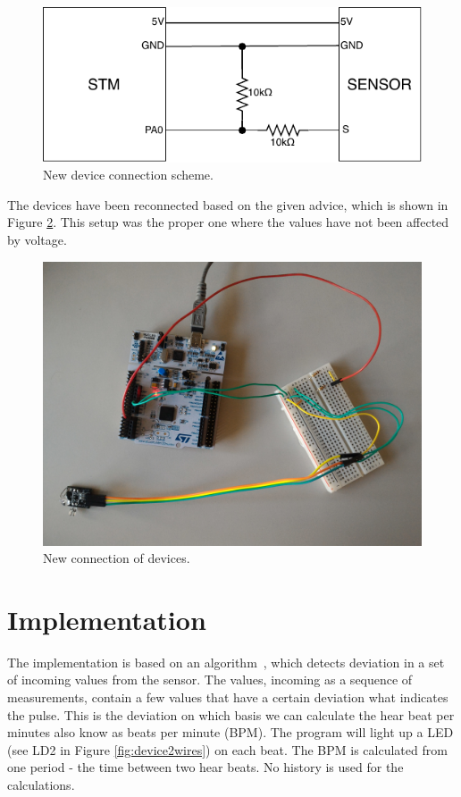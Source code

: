 \documentclass[11pt,a4paper]{article}
\begin{document}
\begin{figure}[H]
    \centering
    \includegraphics[scale=1.4]{img/new_con_scheme.pdf}
    \caption{New device connection scheme.}
    \label{fig:new_con_scheme}
\end{figure}

The devices have been reconnected based on the given advice, which is shown in Figure \ref{fig:new_dev_con}. This setup was the proper one where the values have not been affected by voltage.

\begin{figure}[H]
    \centering
    \includegraphics[scale=0.1]{img/setup2.jpg}
    \caption{New connection of devices.}
    \label{fig:new_dev_con}
\end{figure}

\newpage

\section{Implementation}
The implementation is based on an algorithm~\cite{SENSOR}, which detects deviation in a set of incoming values from the sensor. The values, incoming as a sequence of measurements, contain a few values that have a certain deviation what indicates the pulse. This is the deviation on which basis we can calculate the hear beat per minutes also know as beats per minute (BPM). The program will light up a LED (see LD2 in Figure \ref{fig:device2wires}) on each beat. The BPM is calculated from one period - the time between two hear beats. No history is used for the calculations.\\
\end{document}
